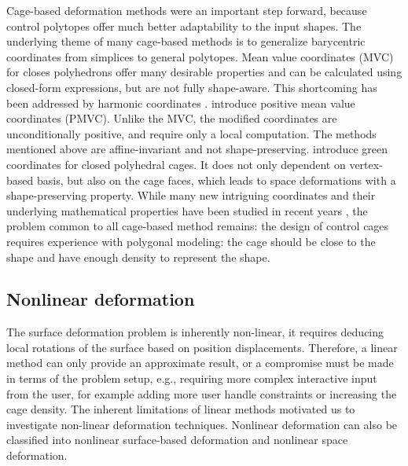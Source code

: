 Cage-based deformation methods were an important step forward, because control polytopes offer much better adaptability to the input shapes. The underlying theme of many cage-based methods is to generalize barycentric coordinates from simplices to general polytopes. Mean value coordinates (MVC) for closes polyhedrons \citep{ju2005mean} offer many desirable properties and can be calculated using closed-form expressions, but are not fully shape-aware. This shortcoming has been addressed by harmonic coordinates \citep{joshi2007harmonic}. \cite{lipman2007gpu} introduce positive mean value coordinates (PMVC). Unlike the MVC, the modified coordinates are unconditionally positive, and require only a local computation. The methods mentioned above are affine-invariant and not shape-preserving. \cite{lipman2008green} introduce green coordinates for closed polyhedral cages. It does not only dependent on vertex-based basis, but also on the cage faces, which leads to space deformations with a shape-preserving property. While many new intriguing coordinates and their underlying mathematical properties have been studied in recent years \citep{hormann2008maximum,weber2011complex,li2013poisson}, the problem common to all cage-based method remains: the design of control cages requires experience with polygonal modeling: the cage should be close to the shape and have enough density to represent the shape.

\subsection{Nonlinear deformation}
The surface deformation problem is inherently non-linear, it requires deducing local rotations of the surface based on position displacements. Therefore, a linear method can only provide an approximate result, or a compromise must be made in terms of the problem setup, e.g., requiring more complex interactive input from the user, for example adding more user handle constraints or increasing the cage density. The inherent limitations of linear methods motivated us to investigate non-linear deformation techniques. Nonlinear deformation can also be classified into nonlinear surface-based deformation and nonlinear space deformation.

